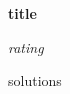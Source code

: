 \documentclass[16pt]{article}
\begin{document}
\begin{center}
    \textbf{\LARGE{ {{ title }} }}
\end{center}

\vspace{0.1cm}

\begin{center}
    \textit{ {{ rating }}}
\end{center}

\vspace{0.25cm}

\begin{multicols}{2}
\begin{enumerate}
{{ solutions }}
\end{enumerate}
\end{multicols}
\end{document}
